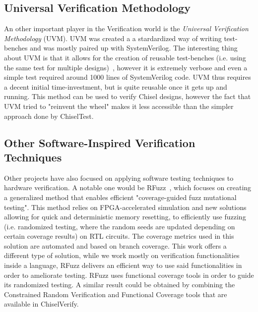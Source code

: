 \documentclass[conference]{IEEEtran}
\begin{document}
\subsection{Universal Verification Methodology}
An other important player in the Verification world is the \textit{Universal Verification Methodology} (UVM). UVM was created a a stardardized way of writing test-benches and was mostly paired up with SystemVerilog. The interesting thing about UVM is that it allows for the creation of reusable test-benches (i.e. using the same test for multiple designs)~\cite{uvm2015}, however it is extremely verbose and even a simple test required around 1000 lines of SystemVerilog code. UVM thus requires a decent initial time-investment, but is quite reusable once it gets up and running. This method can be used to verify Chisel designs, however the fact that UVM tried to "reinvent the wheel" makes it less accessible than the simpler approach done by ChiselTest.

\subsection{Other Software-Inspired Verification Techniques}
Other projects have also focused on applying software testing techniques to hardware verification. A notable one would be RFuzz~\cite{rfuzz2018}, which focuses on creating a generalized method that enables efficient "coverage-guided fuzz mutational testing". This method relies on FPGA-accelerated simulation and new solutions allowing for quick and deterministic memory resetting, to efficiently use fuzzing (i.e. randomized testing, where the random seeds are updated depending on certain coverage results) on RTL circuits. The coverage metrics used in this solution are automated and based on branch coverage. This work offers a different type of solution, while we work mostly on verification functionalities inside a language, RFuzz delivers an efficient way to use said functionalities in order to ameliorate testing. RFuzz uses functional coverage tools in order to guide its randomized testing. A similar result could be obtained by combining the Constrained Random Verification and Functional Coverage tools that are available in ChiselVerify.
\end{document}
